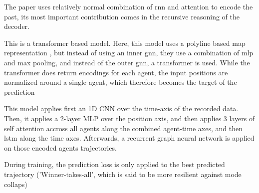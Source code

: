 
\cite{xu2022socialvae} The paper uses relatively normal combination of rnn and attention to encode the past, its most important contribution comes in the recursive reasoning of the decoder.



\cite{shi2022motion} This is a transformer based model. Here, this model uses a polyline based map representation \cite{gao2020vectornet}, but instead of using an inner gnn, they use a combination of mlp and max pooling, and instead of the outer gnn, a transformer is used. While the transformer does return encodings for each agent, the input positions are normalized around a single agent, which therefore becomes the target of the prediction



\cite{zhou2023csr}


\cite{peng2023mrgtraj}


\cite{cheng2023gatraj} This model applies first an 1D CNN over the time-axis of the recorded data. Then, it applies a 2-layer MLP over the position axis, and then applies 3 layers of self attention accross all agents along the combined agent-time axes, and then lstm along the time axes. Afterwards, a recurrent graph neural network is applied on those encoded agents trajectories. 

During training, the prediction loss is only applied to the best predicted trajectory ('Winner-takes-all', which is said to be more resilient against mode collaps)


\cite{narayanan2023ewarenet}



